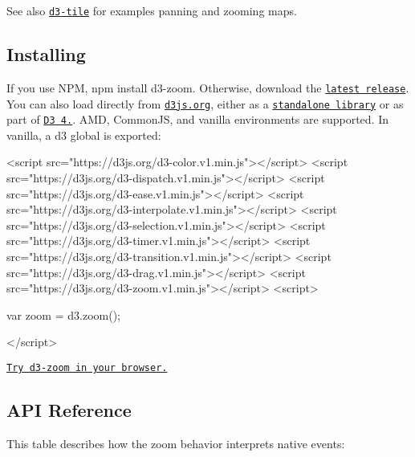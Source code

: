 See also \href{https://github.com/d3/d3-tile}{\tt d3-\/tile} for examples panning and zooming maps.

\subsection*{Installing}

If you use N\+PM, {\ttfamily npm install d3-\/zoom}. Otherwise, download the \href{https://github.com/d3/d3-zoom/releases/latest}{\tt latest release}. You can also load directly from \href{https://d3js.org}{\tt d3js.\+org}, either as a \href{https://d3js.org/d3-zoom.v1.min.js}{\tt standalone library} or as part of \href{https://github.com/d3/d3}{\tt D3 4.}. A\+MD, Common\+JS, and vanilla environments are supported. In vanilla, a {\ttfamily d3} global is exported\+:


\begin{DoxyCode}
<script src="https://d3js.org/d3-color.v1.min.js"></script>
<script src="https://d3js.org/d3-dispatch.v1.min.js"></script>
<script src="https://d3js.org/d3-ease.v1.min.js"></script>
<script src="https://d3js.org/d3-interpolate.v1.min.js"></script>
<script src="https://d3js.org/d3-selection.v1.min.js"></script>
<script src="https://d3js.org/d3-timer.v1.min.js"></script>
<script src="https://d3js.org/d3-transition.v1.min.js"></script>
<script src="https://d3js.org/d3-drag.v1.min.js"></script>
<script src="https://d3js.org/d3-zoom.v1.min.js"></script>
<script>

var zoom = d3.zoom();

</script>
\end{DoxyCode}


\href{https://tonicdev.com/npm/d3-zoom}{\tt Try d3-\/zoom in your browser.}

\subsection*{A\+PI Reference}

This table describes how the zoom behavior interprets native events\+:

